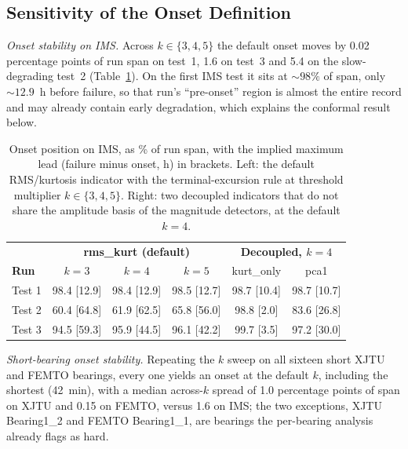 \documentclass[IJPHM, 2026, 0]{PHMSociety}
\begin{document}
\subsection{Sensitivity of the Onset Definition}
\label{sec:onsetsens}
\emph{Onset stability on IMS.} Across $k \in \{3,4,5\}$ the default onset moves by 0.02 percentage points of run span on test~1, 1.6 on test~3 and 5.4 on the slow-degrading test~2 (Table~\ref{tab:onset}). On the first IMS test it sits at ${\sim}98\%$ of span, only ${\sim}12.9$~h before failure, so that run's ``pre-onset'' region is almost the entire record and may already contain early degradation, which explains the conformal result below.

\begin{table}[t] \footnotesize
	\begin{center}
	\caption{Onset position on IMS, as \% of run span, with the implied maximum lead (failure minus onset, h) in brackets. Left: the default RMS/kurtosis indicator with the terminal-excursion rule at threshold multiplier $k \in \{3,4,5\}$. Right: two decoupled indicators that do not share the amplitude basis of the magnitude detectors, at the default $k=4$.}
	\label{tab:onset}
	\setlength{\tabcolsep}{3pt}
	\begin{tabular}{l c c c | c c}
		\hline \hline
		 & \multicolumn{3}{c|}{\textbf{rms\_kurt (default)}} & \multicolumn{2}{c}{\textbf{Decoupled, $k=4$}} \\
		\textbf{Run} & $k=3$ & $k=4$ & $k=5$ & kurt\_only & pca1 \\
		\hline
		Test 1 & 98.4 [12.9] & 98.4 [12.9] & 98.5 [12.7] & 98.7 [10.4] & 98.7 [10.7] \\
		Test 2 & 60.4 [64.8] & 61.9 [62.5] & 65.8 [56.0] & 98.8 [2.0] & 83.6 [26.8] \\
		Test 3 & 94.5 [59.3] & 95.9 [44.5] & 96.1 [42.2] & 99.7 [3.5] & 97.2 [30.0] \\
		\hline \hline
	\end{tabular}
	\end{center}
\end{table}

\emph{Short-bearing onset stability.} Repeating the $k$ sweep on all sixteen short XJTU and FEMTO bearings, every one yields an onset at the default $k$, including the shortest (42~min), with a median across-$k$ spread of 1.0 percentage points of span on XJTU and 0.15 on FEMTO, versus 1.6 on IMS; the two exceptions, XJTU Bearing1\_2 and FEMTO Bearing1\_1, are bearings the per-bearing analysis already flags as hard.
\end{document}
